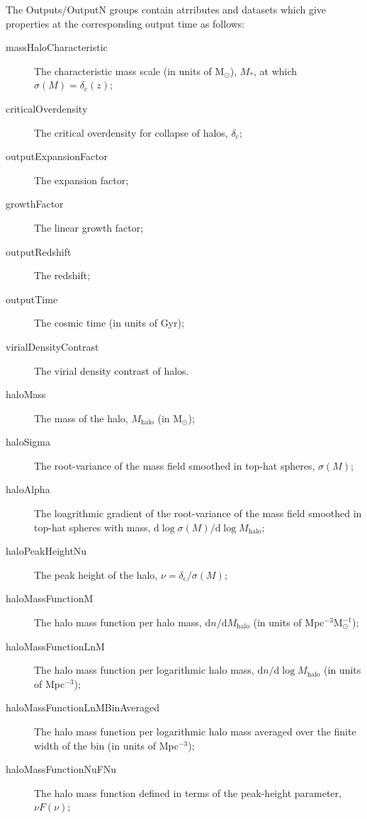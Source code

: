 The {\normalfont \ttfamily Outputs/OutputN} groups contain atrributes and datasets which give properties at the corresponding output time as follows:
\begin{description}
\item [{\normalfont \ttfamily massHaloCharacteristic}] The characteristic mass scale (in units of $\mathrm{M}_\odot$), $M_*$, at which $\sigma(M)=\delta_\mathrm{c}(z)$;
\item [{\normalfont \ttfamily criticalOverdensity}] The critical overdensity for collapse of halos, $\delta_\mathrm{c}$;
\item [{\normalfont \ttfamily outputExpansionFactor}] The expansion factor;
\item [{\normalfont \ttfamily growthFactor}] The linear growth factor;
\item [{\normalfont \ttfamily outputRedshift}] The redshift;
\item [{\normalfont \ttfamily outputTime}] The cosmic time (in units of Gyr);
\item [{\normalfont \ttfamily virialDensityContrast}] The virial density contrast of halos.
\item [{\normalfont \ttfamily haloMass}] The mass of the halo, $M_\mathrm{halo}$ (in $\mathrm{M}_\odot$);
\item [{\normalfont \ttfamily haloSigma}] The root-variance of the mass field smoothed in top-hat spheres, $\sigma(M)$;
\item [{\normalfont \ttfamily haloAlpha}] The loagrithmic gradient of the root-variance of the mass field smoothed in top-hat spheres with mass, $\mathrm{d}\log\sigma(M)/\mathrm{d}\log M_\mathrm{halo}$;
\item [{\normalfont \ttfamily haloPeakHeightNu}] The peak height of the halo, $\nu = \delta_\mathrm{c}/\sigma(M)$;
\item [{\normalfont \ttfamily haloMassFunctionM}] The halo mass function per halo mass, $\mathrm{d}n/\mathrm{d}M_\mathrm{halo}$ (in units of Mpc$^{-3} \mathrm{M}_\odot^{-1}$);
\item [{\normalfont \ttfamily haloMassFunctionLnM}] The halo mass function per logarithmic halo mass, $\mathrm{d}n/\mathrm{d}\log M_\mathrm{halo}$ (in units of Mpc$^{-3}$);
\item [{\normalfont \ttfamily haloMassFunctionLnMBinAveraged}] The halo mass function per logarithmic halo mass averaged over the finite width of the bin (in units of Mpc$^{-3}$);
\item [{\normalfont \ttfamily haloMassFunctionNuFNu}] The halo mass function defined in terms of the peak-height parameter, $\nu F(\nu)$;

\end{description}
